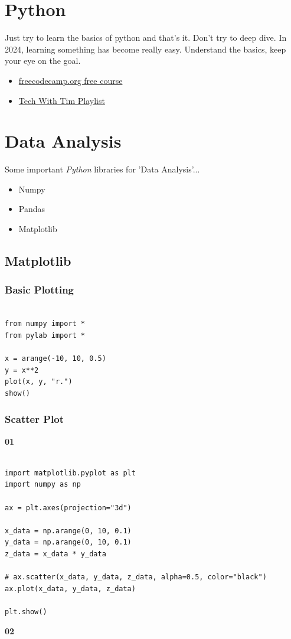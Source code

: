 \documentclass{book}
\begin{document}
\chapter{Python}
Just try to learn the basics of python and that's it. Don't try to deep dive.
In 2024, learning something has become really easy. Understand the basics, keep your eye on the goal.
\begin{itemize}
	\item \href{https://youtu.be/rfscVS0vtbw?si=sfz5vdTybYIppFXz}{freecodecamp.org free course}
	\item \href{https://youtube.com/playlist?list=PLzMcBGfZo4-mFu00qxl0a67RhjjZj3jXm&si=2mE3gQfgFJAjnbJ3}{Tech With Tim Playlist}
\end{itemize}
\chapter{Data Analysis}
Some important \textit{Python} libraries for 'Data Analysis'...
\begin{itemize}
	\item Numpy
	\item Pandas
	\item Matplotlib
\end{itemize}
\section{Matplotlib}
\subsection{Basic Plotting}
\begin{verbatim}
   
from numpy import *
from pylab import *

x = arange(-10, 10, 0.5)
y = x**2
plot(x, y, "r.")
show()
\end{verbatim}
\subsection{Scatter Plot}
\textbf{01}
\begin{verbatim}
  
import matplotlib.pyplot as plt
import numpy as np

ax = plt.axes(projection="3d")

x_data = np.arange(0, 10, 0.1)
y_data = np.arange(0, 10, 0.1)
z_data = x_data * y_data

# ax.scatter(x_data, y_data, z_data, alpha=0.5, color="black")
ax.plot(x_data, y_data, z_data)

plt.show()
\end{verbatim}
\textbf{02}
\end{document}
